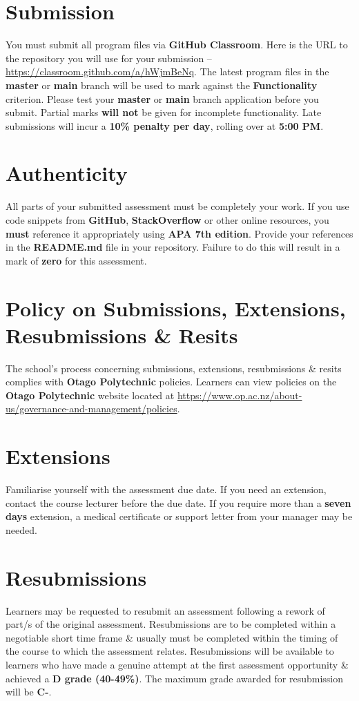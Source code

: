 \documentclass{article}
\begin{document}
\section*{Submission}
You must submit all program files via \textbf{GitHub Classroom}. Here is the URL to the repository you will use for your submission – \href{https://classroom.github.com/a/hWjmBeNq}{https://classroom.github.com/a/hWjmBeNq}. The latest program files in the \textbf{master} or \textbf{main} branch will be used to mark against the \textbf{Functionality} criterion. Please test your \textbf{master} or \textbf{main} branch application before you submit. Partial marks \textbf{will not} be given for incomplete functionality. Late submissions will incur a \textbf{10\% penalty per day}, rolling over at \textbf{5:00 PM}.

\section*{Authenticity}
All parts of your submitted assessment must be completely your work. If you use code snippets from \textbf{GitHub}, \textbf{StackOverflow} or other online resources, you \textbf{must} reference it appropriately using \textbf{APA 7th edition}. Provide your references in the \textbf{README.md} file in your repository. Failure to do this will result in a mark of \textbf{zero} for this assessment.

\section*{Policy on Submissions, Extensions, Resubmissions \& Resits}
The school's process concerning submissions, extensions, resubmissions \& resits complies with \textbf{Otago Polytechnic} policies. Learners can view policies on the \textbf{Otago Polytechnic} website located at \href{https://www.op.ac.nz/about-us/governance-and-management/policies}{https://www.op.ac.nz/about-us/governance-and-management/policies}.

\section*{Extensions}
Familiarise yourself with the assessment due date. If you need an extension, contact the course lecturer before the due date. If you require more than a \textbf{seven days} extension, a medical certificate or support letter from your manager may be needed.

\section*{Resubmissions}
Learners may be requested to resubmit an assessment following a rework of part/s of the original assessment. Resubmissions are to be completed within a negotiable short time frame \& usually must be completed within the timing of the course to which the assessment relates. Resubmissions will be available to learners who have made a genuine attempt at the first assessment opportunity \& achieved a \textbf{D grade (40-49\%)}. The maximum grade awarded for resubmission will be \textbf{C-}.
\end{document}
